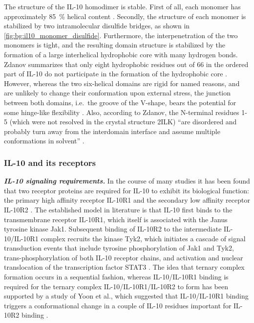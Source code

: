 The structure of the IL-10 homodimer is stable. First of all, each monomer has
approximately \SI{85}{\percent} helical content \cite{Zdanov1995}. Secondly, the
structure of each monomer is stabilized by two intramolecular disulfide bridges,
as shown in \cref{fig:bg:il10_monomer_disulfide}. Furthermore, the
interpenetration of the two monomers is tight, and the resulting domain
structure is stabilized by the formation of a large interhelical hydrophobic
core with many hydrogen bonds. Zdanov summarizes that only eight hydrophobic
residues out of 66 in the ordered part of IL-10 do not participate in the
formation of the hydrophobic core \cite{Zdanov1995}. However, whereas the two
six-helical domains are rigid for named reasons, and are unlikely to change
their conformation upon external stress, the junction between both domains,
i.e.\ the groove of the V-shape, bears the potential for some hinge-like
flexibility \cite{Zdanov1995}. Also, according to Zdanov, the N-terminal
residues 1-5 (which were not resolved in the crystal structure 2ILK)
\enquote{are disordered and probably turn away from the interdomain interface
and assume multiple conformations in solvent} \cite{Zdanov1996}.


\subsubsection{IL-10 and its receptors}


\vspace{0.5cm}
\textit{\textbf{IL-10 signaling requirements.}}
In the course of many studies it has been found that two receptor proteins are
required for IL-10 to exhibit its biological function: the primary high affinity
receptor IL-10R1 and the secondary low affinity receptor IL-10R2
\cite{mosser_il10_newperspectives_2008}. The established model in literature is
that IL-10 first binds to the transmembrane receptor IL-10R1, which itself is
associated with the Janus tyrosine kinase Jak1. Subsequent binding of IL-10R2 to
the intermediate IL-10/IL-10R1 complex recruits the kinase Tyk2, which initiates
a cascade of signal transduction events that include tyrosine phosphorylation of
Jak1 and Tyk2, trans-phosphorylation of both IL-10 receptor chains, and
activation and nuclear translocation of the transcription factor STAT3
\cite{donnelly_finbloom_il10_1999}. The idea that ternary complex formation
occurs in a sequential fashion, whereas IL-10/IL-10R1 binding is required for
the ternary complex IL-10/IL-10R1/IL-10R2 to form has been supported by a study
of Yoon et al., which suggested that IL-10/IL-10R1 binding triggers a
conformational change in a couple of IL-10 residues important for IL-10R2
binding \cite{il10r2_conf_changes_2006}.

